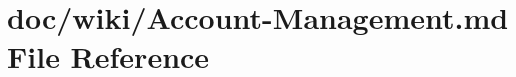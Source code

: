 \hypertarget{_account-_management_8md}{}\section{doc/wiki/\+Account-\/\+Management.md File Reference}
\label{_account-_management_8md}
